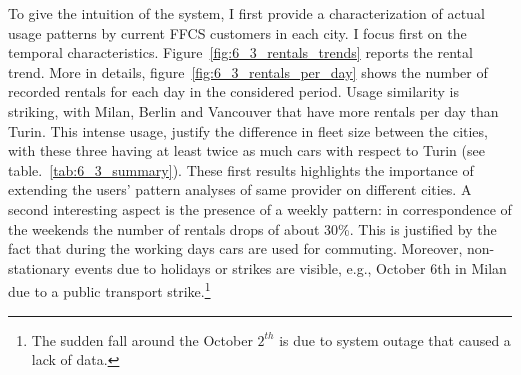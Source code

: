 To give the intuition of the system, I first provide a characterization of actual usage patterns by current FFCS customers in each city. I focus first on the temporal characteristics.
Figure~\ref{fig:6_3_rentals_trends} reports the rental trend. More in details, figure~\ref{fig:6_3_rentals_per_day} shows the number of recorded rentals for each day in the considered period. Usage similarity is striking, with Milan, Berlin and Vancouver that have more rentals per day than Turin. This intense usage, justify the difference in fleet size between the cities, with these three having at least twice as much cars with respect to Turin (see table.~\ref{tab:6_3_summary}). These first results highlights the importance of extending the users' pattern analyses of same provider on different cities. A second interesting aspect is the presence of a weekly pattern: in correspondence of the weekends the number of rentals drops of about 30\%. This is justified by the fact that during the working days cars are used for commuting. Moreover, non-stationary events due to holidays or strikes are visible, e.g., October 6th in Milan due to a public transport strike.\footnote{The sudden fall around the October $2^{th}$ is due to system outage that caused a lack of data.} 

